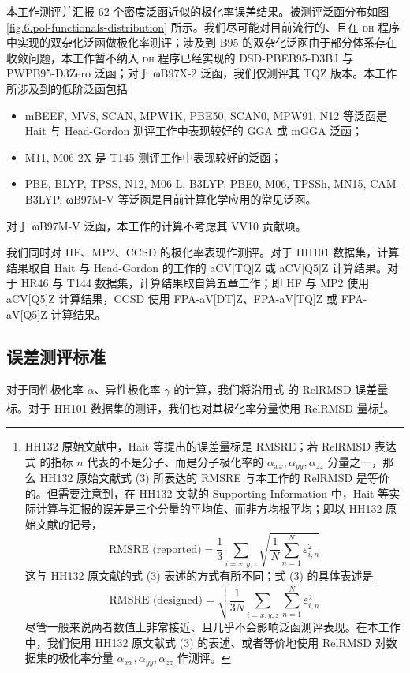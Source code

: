本工作测评并汇报 62 个密度泛函近似的极化率误差结果。被测评泛函分布如图 \ref{fig.6.pol-functionals-distribution} 所示。我们尽可能对目前流行的、且在 \textsc{dh} 程序中实现的双杂化泛函做极化率测评；涉及到 B95 的双杂化泛函由于部分体系存在收敛问题，本工作暂不纳入 \textsc{dh} 程序已经实现的 DSD-PBEB95-D3BJ 与 PWPB95-D3Zero 泛函；对于 ωB97X-2 泛函，我们仅测评其 TQZ 版本。本工作所涉及到的低阶泛函包括
\begin{itemize}[nosep]
    \item mBEEF, MVS, SCAN, MPW1K, PBE50, SCAN0, MPW91, N12 等泛函是 Hait 与 Head-Gordon 测评工作\cite{Hait-Head-Gordon.PCCP.2018}中表现较好的 GGA 或 mGGA 泛函；
    \item M11, M06-2X 是 T145 测评工作\cite{Wu-Thakkar.CPL.2015}中表现较好的泛函；
    \item PBE, BLYP, TPSS, N12, M06-L, B3LYP, PBE0, M06, TPSSh, MN15, CAM-B3LYP, ωB97M-V 等泛函是目前计算化学应用的常见泛函。
\end{itemize}
对于 ωB97M-V 泛函，本工作的计算不考虑其 VV10 贡献项。

我们同时对 HF、MP2、CCSD 的极化率表现作测评。对于 HH101 数据集，计算结果取自 Hait 与 Head-Gordon 的工作的 aCV[TQ]Z 或 aCV[Q5]Z 计算结果。对于 HR46 与 T144 数据集，计算结果取自第五章工作；即 HF 与 MP2 使用 aCV[Q5]Z 计算结果，CCSD 使用 FPA-aV[DT]Z、FPA-aV[TQ]Z 或 FPA-aV[Q5]Z 计算结果。

\subsection{误差测评标准}

对于同性极化率 $\alpha$、异性极化率 $\gamma$ 的计算，我们将沿用式  的 RelRMSD 误差量标。对于 HH101 数据集的测评，我们也对其极化率分量使用 RelRMSD 量标\footnote{HH132 原始文献\cite{Hait-Head-Gordon.PCCP.2018}中，Hait 等提出的误差量标是 RMSRE；若 RelRMSD 表达式  的指标 $n$ 代表的不是分子、而是分子极化率的 $\alpha_{xx}, \alpha_{yy}, \alpha_{zz}$ 分量之一，那么 HH132 原始文献式 (3) 所表达的 RMSRE 与本工作的 RelRMSD 是等价的。但需要注意到，在 HH132 文献的 Supporting Information 中，Hait 等实际计算与汇报的误差是三个分量的平均值、而非方均根平均；即以 HH132 原始文献的记号，
$$
\text{RMSRE (reported)} = \frac{1}{3} \sum_{i=x,y,z} \sqrt{\frac{1}{N} \sum_{n=1}^N \varepsilon_{i,n}^2}
$$
这与 HH132 原文献的式 (3) 表述的方式有所不同；式 (3) 的具体表述是
\begin{equation}
    \label{eq.6.rmsre}
    \text{RMSRE (designed)} = \sqrt{\frac{1}{3N} \sum_{i=x,y,z} \sum_{n=1}^N \varepsilon_{i,n}^2}
\end{equation}
尽管一般来说两者数值上非常接近、且几乎不会影响泛函测评表现。在本工作中，我们使用 HH132 原文献式 (3) 的表述、或者等价地使用 RelRMSD 对数据集的极化率分量 $\alpha_{xx}, \alpha_{yy}, \alpha_{zz}$ 作测评。
}。

